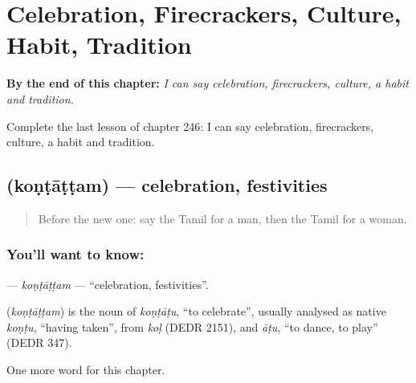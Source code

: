 
\chapter{Celebration, Firecrackers, Culture, Habit, Tradition}
\label{ch:ta-celebration-firecrackers-culture-habit-tradition}

\begin{chapteropening}
\textbf{By the end of this chapter:} \emph{I can say celebration, firecrackers, culture, a habit and tradition.}

Complete the last lesson of chapter 246: I can say celebration, firecrackers, culture, a habit and tradition.
\end{chapteropening}

\section[\texorpdfstring{\ta{கொண்டாட்டம்} (koṇṭāṭṭam)}{கொண்டாட்டம் (koṇṭāṭṭam)}]{ (koṇṭāṭṭam) — celebration, festivities}

\label{lesson:TA-C246-kontattam}



\begin{quote}
Before the new one: say the Tamil for a man, then the Tamil for a woman.
\end{quote}

\subsection*{You'll want to know: }
\textbf{} — \emph{koṇṭāṭṭam} — \textquotedblleft{}celebration, festivities\textquotedblright{}.

\begin{cousinweb}
\textbf{} (\emph{koṇṭāṭṭam}) is the noun of \emph{koṇṭāṭu}, \textquotedblleft{}to celebrate\textquotedblright{}, usually analysed as native \emph{koṇṭu}, \textquotedblleft{}having taken\textquotedblright{}, from \emph{koḷ} (DEDR 2151), and \emph{āṭu}, \textquotedblleft{}to dance, to play\textquotedblright{} (DEDR 347).
\end{cousinweb}

\begin{grammarlens}[title={What you've built}]
One more word for this chapter.
\end{grammarlens}

